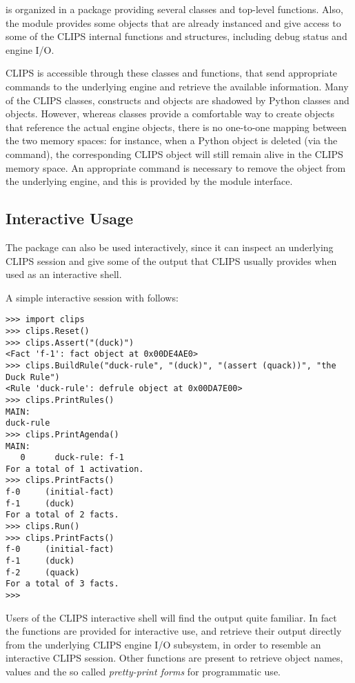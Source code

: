 \pyclips{} is organized in a package providing several classes and
top-level functions. Also, the module provides some objects that are
already instanced and give access to some of the CLIPS internal
functions and structures, including debug status and engine I/O.

CLIPS is accessible through these classes and functions, that send
appropriate commands to the underlying engine and retrieve the
available information. Many of the CLIPS classes, constructs and
objects are shadowed by Python classes and objects. However, whereas
\pyclips{} classes provide a comfortable way to create objects that
reference the actual engine objects, there is no one-to-one
mapping between the two memory spaces: for instance, when a Python
object is deleted (via the  command), the corresponding
CLIPS object will still remain alive in the CLIPS memory space. An
appropriate command is necessary to remove the object from the
underlying engine, and this is provided by the module interface.


\subsection{Interactive Usage\label{pyclips-ov-interactive}}

The \pyclips{} package can also be used interactively, since it can
inspect an underlying CLIPS session and give some of the output that
CLIPS usually provides when used as an interactive shell.

A simple interactive session with \pyclips{} follows:

\begin{verbatim}
>>> import clips
>>> clips.Reset()
>>> clips.Assert("(duck)")
<Fact 'f-1': fact object at 0x00DE4AE0>
>>> clips.BuildRule("duck-rule", "(duck)", "(assert (quack))", "the Duck Rule")
<Rule 'duck-rule': defrule object at 0x00DA7E00>
>>> clips.PrintRules()
MAIN:
duck-rule
>>> clips.PrintAgenda()
MAIN:
   0      duck-rule: f-1
For a total of 1 activation.
>>> clips.PrintFacts()
f-0     (initial-fact)
f-1     (duck)
For a total of 2 facts.
>>> clips.Run()
>>> clips.PrintFacts()
f-0     (initial-fact)
f-1     (duck)
f-2     (quack)
For a total of 3 facts.
>>>
\end{verbatim}

Users of the CLIPS interactive shell will find the \pyclips{} output
quite familiar. In fact the  functions
are provided for interactive use, and retrieve their output directly from
the underlying CLIPS engine I/O subsystem, in order to resemble an
interactive CLIPS session. Other functions are present to retrieve
object names, values and the so called \emph{pretty-print forms} for
programmatic use.



